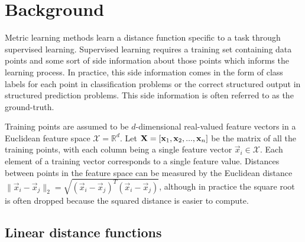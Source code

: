 \section{Background}











Metric learning methods learn a distance function specific to a task through supervised learning. Supervised learning requires a training set containing data points and some sort of side information about those points which informs the learning process. In practice, this side information comes in the form of class labels for each point in classification problems or the correct structured output in structured prediction problems. This side information is often referred to as the ground-truth.

Training points are assumed to be $d$-dimensional real-valued feature vectors in a Euclidean feature space $\mathcal{X} = \mathbb{R}^d$. Let $\mathbf{X} = \left[ \mathbf{x}_1, \mathbf{x}_2, ..., \mathbf{x}_n \right]$ be the matrix of all the training points, with each column being a single feature vector $\vec{x}_i \in \mathcal{X}$. Each element of a training vector corresponds to a single feature value. Distances between points in the feature space can be measured by the Euclidean distance $\|\vec{x}_i - \vec{x}_j\|_2 = \sqrt{(\vec{x}_i - \vec{x}_j)^T(\vec{x}_i - \vec{x}_j)}$, although in practice the square root is often dropped because the squared distance is easier to compute.



\subsection{Linear distance functions}

